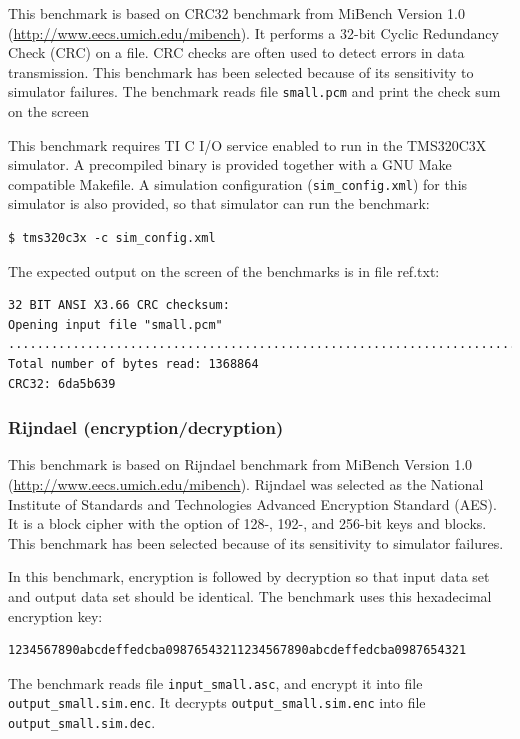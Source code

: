 This benchmark is based on CRC32 benchmark from MiBench Version 1.0 (\url{http://www.eecs.umich.edu/mibench}).
It performs a 32-bit Cyclic Redundancy Check (CRC) on a file. CRC checks are often used to detect errors in data transmission.
This benchmark has been selected because of its sensitivity to simulator failures.
The benchmark reads file \texttt{small.pcm} and print the check sum on the screen

This benchmark requires TI C I/O service enabled to run in the TMS320C3X simulator.
A precompiled binary is provided together with a GNU Make compatible Makefile.
A simulation configuration (\texttt{sim\_config.xml}) for this simulator is also provided, so that simulator can run the benchmark:

\begin{verbatim}
$ tms320c3x -c sim_config.xml
\end{verbatim}

\noindent The expected output on the screen of the benchmarks is in file ref.txt:

\begin{verbatim}
32 BIT ANSI X3.66 CRC checksum:
Opening input file "small.pcm"
....................................................................................
Total number of bytes read: 1368864
CRC32: 6da5b639
\end{verbatim}

\subsubsection{Rijndael (encryption/decryption)}

This benchmark is based on Rijndael benchmark from MiBench Version 1.0 (\url{http://www.eecs.umich.edu/mibench}).
Rijndael was selected as the National Institute of Standards and Technologies Advanced Encryption Standard (AES).
It is a block cipher with the option of 128-, 192-, and 256-bit keys and blocks.
This benchmark has been selected because of its sensitivity to simulator failures.

In this benchmark, encryption is followed by decryption so that input data set and output data set should be identical.
The benchmark uses this hexadecimal encryption key:
\begin{verbatim}
1234567890abcdeffedcba09876543211234567890abcdeffedcba0987654321
\end{verbatim}
The benchmark reads file \texttt{input\_small.asc}, and encrypt it into file \texttt{output\_small.sim.enc}.
It decrypts \texttt{output\_small.sim.enc} into file \texttt{output\_small.sim.dec}.

